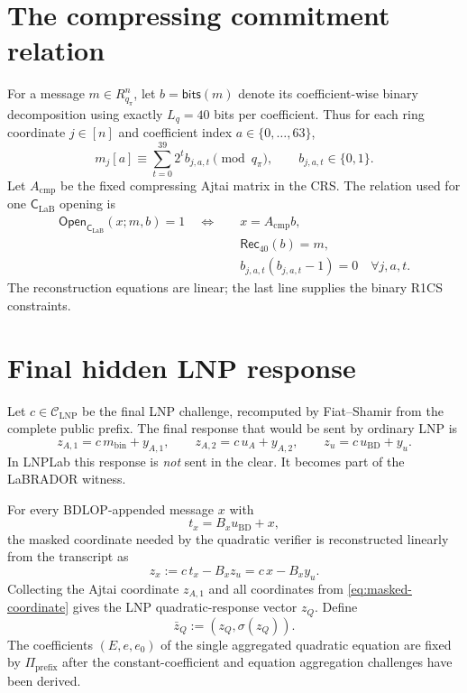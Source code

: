 \documentclass[11pt]{article}
\newcommand{\Rpi}{R_{q_\pi}}
\newcommand{\CLaB}{\mathsf C_{\mathrm{LaB}}}
\newcommand{\Rec}{\mathsf{Rec}}
\newcommand{\Open}{\mathsf{Open}}
\newcommand{\bits}{\mathsf{bits}}
\begin{document}
\section{The compressing commitment relation}

For a message $m\in\Rpi^n$, let $b=\bits(m)$ denote its coefficient-wise
binary decomposition using exactly $L_q=40$ bits per coefficient.  Thus for
each ring coordinate $j\in[n]$ and coefficient index $a\in\{0,\ldots,63\}$,
\begin{equation}
 m_j[a]
 \equiv
 \sum_{t=0}^{39} 2^t b_{j,a,t}
 \pmod{q_\pi},
 \qquad b_{j,a,t}\in\{0,1\}.
 \label{eq:bit-reconstruction}
\end{equation}
Let $A_{\mathrm{cmp}}$ be the fixed compressing Ajtai matrix in the CRS.  The
relation used for one $\CLaB$ opening is
\begin{equation}
\boxed{
\begin{aligned}
 \Open_{\CLaB}(x;m,b)=1
 \quad\Longleftrightarrow\quad
 &x=A_{\mathrm{cmp}}b,\\
 &\Rec_{40}(b)=m,\\
 &b_{j,a,t}(b_{j,a,t}-1)=0
 \quad\forall j,a,t.
\end{aligned}}
\label{eq:clab-open}
\end{equation}
The reconstruction equations are linear; the last line supplies the binary
R1CS constraints.

\section{Final hidden LNP response}

Let $c\in\mathcal C_{\mathrm{LNP}}$ be the final LNP challenge, recomputed by
Fiat--Shamir from the complete public prefix.  The final response that would
be sent by ordinary LNP is
\begin{equation}
  z_{A,1}=c\,m_{\mathrm{bin}}+y_{A,1},\qquad
  z_{A,2}=c\,u_A+y_{A,2},\qquad
  z_u=c\,u_{\mathrm{BD}}+y_u.
  \label{eq:final-responses}
\end{equation}
In LNPLab this response is \emph{not} sent in the clear.  It becomes part of
the LaBRADOR witness.

For every BDLOP-appended message $x$ with
\[
  t_x=B_xu_{\mathrm{BD}}+x,
\]
the masked coordinate needed by the quadratic verifier is reconstructed
linearly from the transcript as
\begin{equation}
  z_x:=c\,t_x-B_xz_u
      =c\,x-B_xy_u.
  \label{eq:masked-coordinate}
\end{equation}
Collecting the Ajtai coordinate $z_{A,1}$ and all coordinates from
\eqref{eq:masked-coordinate} gives the LNP quadratic-response vector $z_Q$.
Define
\[
  \bar z_Q:=(z_Q,\sigma(z_Q)).
\]
The coefficients $(E,e,e_0)$ of the single aggregated quadratic equation are
fixed by $\Pi_{\mathrm{prefix}}$ after the constant-coefficient and equation
aggregation challenges have been derived.
\end{document}
